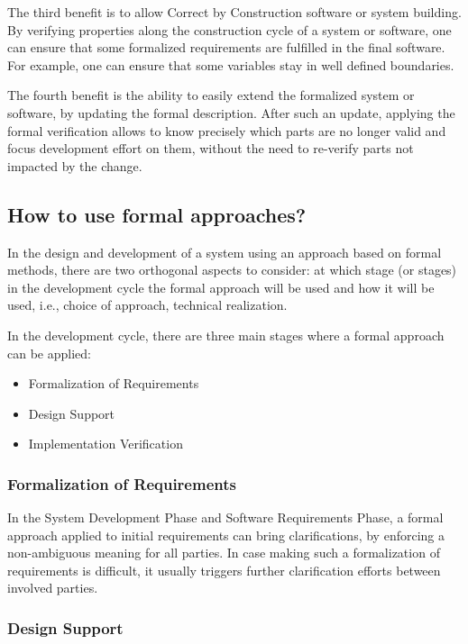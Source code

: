 The third benefit is to allow Correct by Construction software or
system building. By verifying properties along the construction
cycle of a system or software, one can ensure that some formalized
requirements are fulfilled in the final software. For example, one can
ensure that some variables stay in well defined boundaries.

The fourth benefit is the ability to easily extend the formalized
system or software, by updating the formal description. After such an
update, applying the formal verification allows to know precisely
which parts are no longer valid and focus development effort on them,
without the need to re-verify parts not impacted by the change.

\subsection{How to use formal approaches?}

In the design and development of a system using an approach based on
formal methods, there are two orthogonal aspects to consider: at which
stage (or stages) in the development cycle the formal approach will be
used and how it will be used, i.e., choice of approach, technical
realization.

In the development cycle, there are three main stages where a formal
approach can be applied:

\begin{itemize}
\item Formalization of Requirements
\item Design Support
\item Implementation Verification
\end{itemize}

\subsubsection{Formalization of Requirements}
\label{sec:formalization-of-req}

In the System Development Phase and Software Requirements Phase, a
formal approach applied to initial requirements can bring
clarifications, by enforcing a non-ambiguous meaning for all
parties. In case making such a formalization of requirements is
difficult, it usually triggers further clarification efforts between
involved parties.

\subsubsection{Design Support}
\label{sec:design-support}

